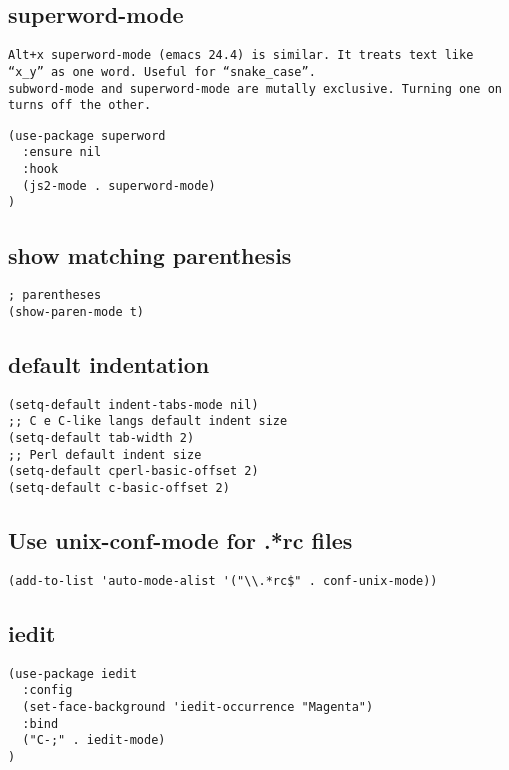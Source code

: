 \documentclass[11pt]{article}
\begin{document}
\subsection*{superword-mode}
\label{sec:org4e53c38}

\begin{verbatim}
Alt+x superword-mode (emacs 24.4) is similar. It treats text like “x_y” as one word. Useful for “snake_case”.
subword-mode and superword-mode are mutally exclusive. Turning one on turns off the other.
\end{verbatim}


\begin{verbatim}
(use-package superword
  :ensure nil
  :hook
  (js2-mode . superword-mode)
)
\end{verbatim}

\subsection*{show matching parenthesis}
\label{sec:org6ce399f}
\begin{verbatim}
; parentheses
(show-paren-mode t)
\end{verbatim}

\subsection*{default indentation}
\label{sec:org5709edf}
\begin{verbatim}
(setq-default indent-tabs-mode nil)
;; C e C-like langs default indent size
(setq-default tab-width 2)
;; Perl default indent size
(setq-default cperl-basic-offset 2)
(setq-default c-basic-offset 2)
\end{verbatim}

\subsection*{Use unix-conf-mode for .*rc files}
\label{sec:org5ba23c2}
\begin{verbatim}
(add-to-list 'auto-mode-alist '("\\.*rc$" . conf-unix-mode))
\end{verbatim}

\subsection*{iedit}
\label{sec:orgf4bbf9e}
\begin{verbatim}
(use-package iedit
  :config
  (set-face-background 'iedit-occurrence "Magenta")
  :bind
  ("C-;" . iedit-mode)
)
\end{verbatim}
\end{document}
